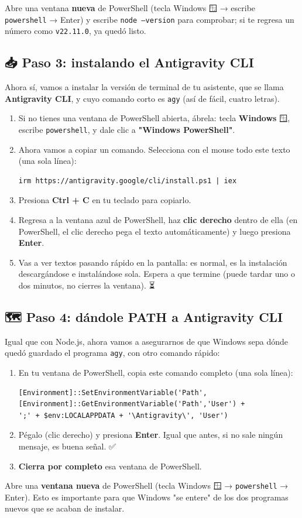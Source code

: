 \documentclass[12pt]{article}
\begin{document}
Abre una ventana \textbf{nueva} de PowerShell (tecla Windows 🪟 → escribe \texttt{powershell} → Enter) y escribe \texttt{node --version} para comprobar; si te regresa un número como \texttt{v22.11.0}, ya quedó listo. 🎉

\subsection{📥 Paso 3: instalando el Antigravity CLI}
Ahora sí, vamos a instalar la versión de terminal de tu asistente, que se llama \textbf{Antigravity CLI}, y cuyo comando corto es \texttt{agy} (así de fácil, cuatro letras).

\begin{enumerate}
    \item Si no tienes una ventana de PowerShell abierta, ábrela: tecla \textbf{Windows} 🪟, escribe \texttt{powershell}, y dale clic a \textbf{"Windows PowerShell"}.
    \item Ahora vamos a copiar un comando. Selecciona con el mouse todo este texto (una sola línea):
\begin{verbatim}
irm https://antigravity.google/cli/install.ps1 | iex
\end{verbatim}
    \item Presiona \textbf{Ctrl + C} en tu teclado para copiarlo.
    \item Regresa a la ventana azul de PowerShell, haz \textbf{clic derecho} dentro de ella (en PowerShell, el clic derecho pega el texto automáticamente) y luego presiona \textbf{Enter}.
    \item Vas a ver textos pasando rápido en la pantalla: es normal, es la instalación descargándose e instalándose sola. Espera a que termine (puede tardar uno o dos minutos, no cierres la ventana). ⏳
\end{enumerate}

\subsection{🗺️ Paso 4: dándole PATH a Antigravity CLI}
Igual que con Node.js, ahora vamos a asegurarnos de que Windows sepa dónde quedó guardado el programa \texttt{agy}, con otro comando rápido:

\begin{enumerate}
    \item En tu ventana de PowerShell, copia este comando completo (una sola línea):
\begin{verbatim}
[Environment]::SetEnvironmentVariable('Path',
[Environment]::GetEnvironmentVariable('Path','User') +
';' + $env:LOCALAPPDATA + '\Antigravity\', 'User')
\end{verbatim}
    \item Pégalo (clic derecho) y presiona \textbf{Enter}. Igual que antes, si no sale ningún mensaje, es buena señal. ✅
    \item \textbf{Cierra por completo} esa ventana de PowerShell.
\end{enumerate}
Abre una \textbf{ventana nueva} de PowerShell (tecla Windows 🪟 → \texttt{powershell} → Enter). Esto es importante para que Windows "se entere" de los dos programas nuevos que se acaban de instalar.
\end{document}

